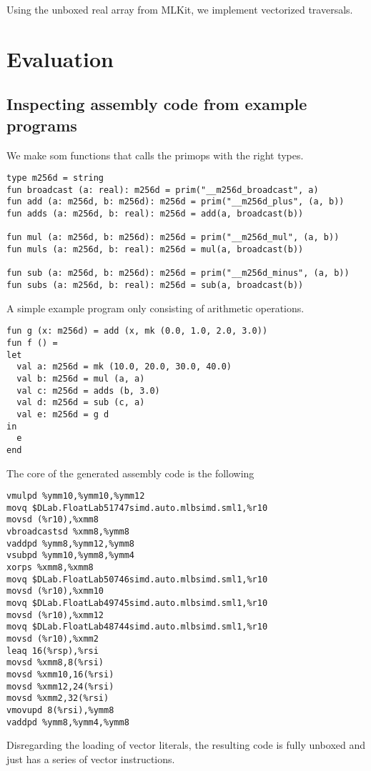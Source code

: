 \documentclass{article}
\begin{document}
Using the unboxed real array from MLKit, we implement vectorized traversals.

\section{Evaluation}

\subsection{Inspecting assembly code from example programs}

We make som functions that calls the primops with the right types.
\begin{lstlisting}
type m256d = string
fun broadcast (a: real): m256d = prim("__m256d_broadcast", a)
fun add (a: m256d, b: m256d): m256d = prim("__m256d_plus", (a, b))
fun adds (a: m256d, b: real): m256d = add(a, broadcast(b))

fun mul (a: m256d, b: m256d): m256d = prim("__m256d_mul", (a, b))
fun muls (a: m256d, b: real): m256d = mul(a, broadcast(b))

fun sub (a: m256d, b: m256d): m256d = prim("__m256d_minus", (a, b))
fun subs (a: m256d, b: real): m256d = sub(a, broadcast(b))
\end{lstlisting}
A simple example program only consisting of arithmetic operations.
\begin{lstlisting}
fun g (x: m256d) = add (x, mk (0.0, 1.0, 2.0, 3.0))
fun f () =
let
  val a: m256d = mk (10.0, 20.0, 30.0, 40.0)
  val b: m256d = mul (a, a)
  val c: m256d = adds (b, 3.0)
  val d: m256d = sub (c, a)
  val e: m256d = g d
in 
  e
end
\end{lstlisting}
The core of the generated assembly code is the following
\begin{verbatim}
vmulpd %ymm10,%ymm10,%ymm12
movq $DLab.FloatLab51747simd.auto.mlbsimd.sml1,%r10
movsd (%r10),%xmm8
vbroadcastsd %xmm8,%ymm8
vaddpd %ymm8,%ymm12,%ymm8
vsubpd %ymm10,%ymm8,%ymm4
xorps %xmm8,%xmm8
movq $DLab.FloatLab50746simd.auto.mlbsimd.sml1,%r10
movsd (%r10),%xmm10
movq $DLab.FloatLab49745simd.auto.mlbsimd.sml1,%r10
movsd (%r10),%xmm12
movq $DLab.FloatLab48744simd.auto.mlbsimd.sml1,%r10
movsd (%r10),%xmm2
leaq 16(%rsp),%rsi
movsd %xmm8,8(%rsi)
movsd %xmm10,16(%rsi)
movsd %xmm12,24(%rsi)
movsd %xmm2,32(%rsi)
vmovupd 8(%rsi),%ymm8
vaddpd %ymm8,%ymm4,%ymm8
\end{verbatim}
Disregarding the loading of vector literals, the resulting code is fully unboxed and just has a series of vector instructions.
\end{document}
